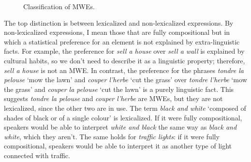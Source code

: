 \documentclass[output=paper]{langsci/langscibook}
\begin{document}
\begin{figure}[h]
\centering
\caption{Classification of MWEs.}
\label{fig:1}
\end{figure}



\largerpage
The top distinction is between lexicalized and non-lexicalized expressions. 
By non-lexicalized expressions, I mean those that are fully compositional but in which a statistical preference for an element is not explained by extra-linguistic facts. For example, the preference for \textit{sell a house} over \textit{sell a wall} is explained by cultural habits, so we don’t need to describe it as a linguistic property; therefore, \textit{sell a house} is not an MWE. In contrast, the preference for the  phrases \textit{tondre la pelouse} ‘mow the lawn’ and \textit{couper l’herbe} ‘cut the grass’ over \textit{tondre l’herbe} ‘mow the grass’ and \textit{couper la pelouse} ‘cut the lawn’ is a purely linguistic fact. This suggests \textit{tondre la pelouse} and \textit{couper l’herbe} are MWEs, but they are not lexicalized, since the other two are in use. The term\textit{ black and white} ‘composed of shades of black or of a single colour’ is lexicalized. 
If it were fully compositional, speakers would be able to interpret \textit{white and black} the same way as\textit{ black and white}, which they aren’t. The same holds for \textit{traffic lights}: if it were fully compositional, speakers would be able to interpret it as another type of light connected with traffic.
\end{document}
